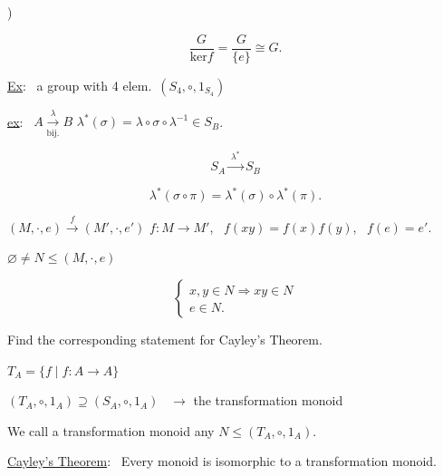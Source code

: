 )

\[
\frac{G}{\text{ker}f} = \frac{G}{\{e\}} \cong G.
\]

\bigskip
\noindent\underline{Ex}: \ a group with 4 elem.\ $(S_4,\circ,1_{S_4})$

\bigskip
\noindent\underline{ex}: \ $A \xrightarrow[\text{bij.}]{\ \lambda\ } B$ \qquad $\lambda^*(\sigma) = \lambda\circ\sigma\circ\lambda^{-1} \in S_B$.

\[
S_A \xrightarrow{\ \lambda^*\ } S_B
\]

\[
\lambda^*(\sigma\circ\pi) = \lambda^*(\sigma)\circ\lambda^*(\pi).
\]

\bigskip
\noindent $(M,\cdot,e) \xrightarrow{\ f\ } (M',\cdot,e')$ \quad $f:M\to M'$, \ $f(xy)=f(x)f(y)$, \ $f(e)=e'$.

\bigskip
\noindent $\varnothing \neq N \leq (M,\cdot,e)$

\[
\begin{cases}
x,y\in N \Rightarrow xy\in N\\
e\in N.
\end{cases}
\]

\bigskip
\noindent Find the corresponding statement for Cayley's Theorem.

\bigskip
\noindent $T_A = \{f \mid f:A\to A\}$

\noindent $(T_A,\circ,1_A) \supseteq (S_A,\circ,1_A)$ \ $\to$ the transformation monoid

\bigskip
\noindent We call a transformation monoid any $N\leq (T_A,\circ,1_A)$.

\bigskip
\noindent\underline{Cayley's Theorem}: \ Every monoid is isomorphic to a transformation monoid.

